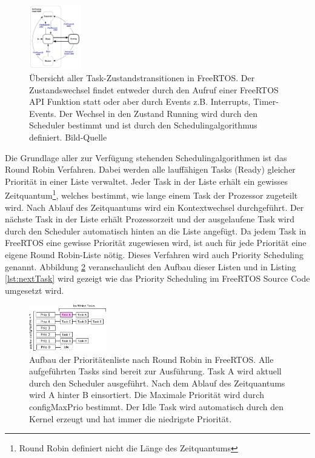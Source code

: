 \begin{figure}[ht!]
	\centering
		\includegraphics[width=0.2\textwidth]{Pictures/FreeRTOSOrg/taskStates.png}
	\caption{Übersicht aller Task-Zustandstransitionen in FreeRTOS. Der Zustandswechsel findet entweder durch den Aufruf einer FreeRTOS API Funktion statt oder aber durch Events z.B. Interrupts, Timer-Events. Der Wechsel in den Zustand Running wird durch den Scheduler bestimmt und ist durch den Schedulingalgorithmus definiert.  Bild-Quelle~\protect{}}
	\label{fig:TaskStates}
\end{figure} 
\newline
Die Grundlage aller zur Verfügung stehenden Scheduling\-algorithmen ist das Round Robin Verfahren\cite{9783827373427}. Dabei werden alle lauf\-fäh\-igen Tasks (Ready) gleicher Priorität in einer Liste verwaltet. Jeder Task in der Liste erhält ein gewisses Zeitquantum\footnote{Round Robin definiert nicht die Länge des Zeitquantums}, welches bestimmt, wie lange einem Task der Prozessor zugeteilt wird. Nach Ablauf des Zeitquantums wird ein Kontextwechsel durchgeführt. Der näch\-ste Task in der Liste erhält Prozessorzeit und der ausgelaufene Task wird durch den Scheduler automatisch hinten an die Liste angefügt. Da jedem Task in FreeRTOS eine gewisse Priorität zugewiesen wird, ist auch für jede Priorität eine eigene Round Robin-Liste nötig. Dieses Verfahren wird auch Priority Scheduling \cite{9783827373427} genannt. Abbildung \ref{fig:PrioList1} veranschaulicht den Aufbau dieser Listen und in Listing \ref{lst:nextTask} wird gezeigt wie das Priority Scheduling im FreeRTOS Source Code umgesetzt wird. 
\begin{figure}[htb]
	\centering
		\includegraphics[width=0.3\textwidth]{Pictures/Scheduling/PrioList1.png}
	\caption{Aufbau der Prioritätenliste nach Round Robin in FreeRTOS. Alle aufgeführten Tasks sind bereit zur Ausführung. Task A wird aktuell durch den Scheduler ausgeführt. Nach dem Ablauf des Zeitquantums wird A hinter B einsortiert. Die Maximale Priorität wird durch configMaxPrio bestimmt. Der Idle Task wird automatisch durch den Kernel erzeugt und hat immer die niedrigste Priorität. }
	\label{fig:PrioList1}
\end{figure}
